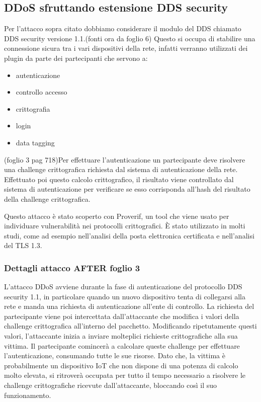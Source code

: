 \subsection{DDoS sfruttando estensione DDS security}
Per l'attacco sopra citato dobbiamo considerare il modulo del DDS 
chiamato DDS security
versione 1.1.(fonti ora da foglio 6) Questo si occupa di stabilire una
connessione sicura tra i vari dispositivi della rete, infatti verranno utilizzati
dei plugin da parte dei partecipanti che servono a: 
\begin{itemize}
    \item autenticazione
    \item controllo accesso
    \item crittografia
    \item login
    \item data tagging
\end{itemize}\cite{ddssecurity1.1}
(foglio 3 pag 718)Per effettuare l'autenticazione un partecipante deve
risolvere una challenge crittografica richiesta dal sistema di autenticazione
della rete. Effettuato poi questo calcolo crittografico, il risultato viene
controllato dal sistema di autenticazione per verificare se esso corrisponda
all'hash del risultato della challenge crittografica.\cite{DBLP:conf/asiaccs/WangLG24}

Questo attacco è stato scoperto con Proverif, un tool che viene usato
per individuare vulnerabilità nei protocolli crittografici. 
È stato utilizzato in molti studi, come ad esempio nell'analisi della 
posta elettronica certificata e nell'analisi del TLS 1.3.\cite{proverifmanual}

\subsubsection{Dettagli attacco AFTER foglio 3}
L'attacco DDoS avviene durante la fase di autenticazione del protocollo
DDS security 1.1, in particolare quando un nuovo dispositivo tenta di
collegarsi alla rete e manda una richiesta di autenticazione
all'ente di controllo. La richiesta del partecipante viene poi intercettata
dall'attaccante che modifica i valori della challenge crittografica 
all'interno del pacchetto. Modificando ripetutamente questi valori, l'attaccante
inizia a inviare molteplici richieste crittografiche alla sua vittima.
Il partecipante comincerà a calcolare queste challenge per effettuare
l'autenticazione, consumando tutte le sue risorse.
Dato che, la vittima è probabilmente un dispositivo IoT
che non dispone di una potenza di calcolo molto elevata, si ritroverà
occupata per tutto il tempo necessario a risolvere le challenge crittografiche
ricevute dall'attaccante, bloccando così il suo funzionamento.\cite{DBLP:conf/asiaccs/WangLG24}


